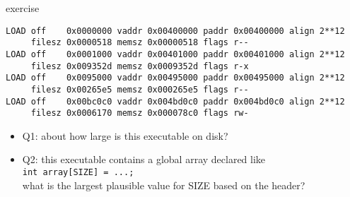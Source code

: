 \begin{frame}[fragile,label=elfStaticEx]{exercise}
\begin{Verbatim}[commandchars=\\\{\},fontsize=\small]
LOAD off    0x0000000 vaddr 0x00400000 paddr 0x00400000 align 2**12
     filesz 0x0000518 memsz 0x00000518 flags r--
LOAD off    0x0001000 vaddr 0x00401000 paddr 0x00401000 align 2**12
     filesz 0x009352d memsz 0x0009352d flags r-x
LOAD off    0x0095000 vaddr 0x00495000 paddr 0x00495000 align 2**12
     filesz 0x00265e5 memsz 0x000265e5 flags r--
LOAD off    0x00bc0c0 vaddr 0x004bd0c0 paddr 0x004bd0c0 align 2**12
     filesz 0x0006170 memsz 0x000078c0 flags rw-
\end{Verbatim}
\begin{itemize}
\item Q1: about how large is this executable on disk?
\item Q2: this executable contains a global array declared like \\\texttt{int array[SIZE] = {...};} \\
        what is the largest plausible value for SIZE based on the header?
\end{itemize}
\end{frame}

